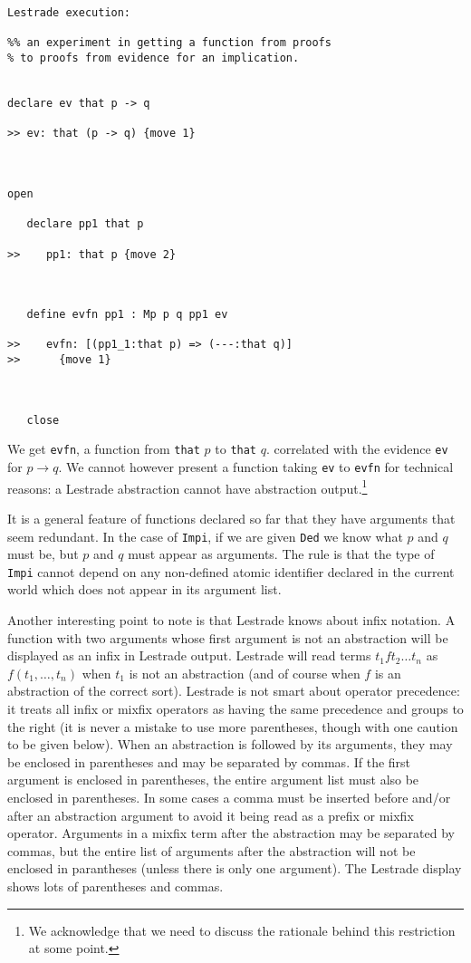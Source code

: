 \documentclass[12pt]{article}
\begin{document}
\begin{verbatim}Lestrade execution:

%% an experiment in getting a function from proofs
% to proofs from evidence for an implication.


declare ev that p -> q

>> ev: that (p -> q) {move 1}



open

   declare pp1 that p

>>    pp1: that p {move 2}



   define evfn pp1 : Mp p q pp1 ev

>>    evfn: [(pp1_1:that p) => (---:that q)]
>>      {move 1}



   close
\end{verbatim}

We get {\tt evfn}, a function from {\tt that} $p$ to {\tt that} $q$. correlated with the evidence {\tt ev} for $p \rightarrow q$.  We cannot however present a function
taking {\tt ev} to {\tt evfn} for technical reasons: a Lestrade abstraction cannot have abstraction output.\footnote{We acknowledge that we need to discuss the rationale behind this restriction at some point.}

It is a general feature of functions declared so far that they have arguments that seem redundant.  In the case of {\tt Impi}, if we are given {\tt Ded} we know what $p$ and $q$ must be, but $p$ and $q$ must appear as arguments.  The rule is that the type of {\tt Impi} cannot depend on any non-defined atomic identifier declared in the current world which does not appear in its argument list.

Another interesting point to note is that Lestrade knows about infix notation.  A function with two arguments whose first argument is not an abstraction will be displayed
as an infix in Lestrade output.  Lestrade will read terms $t_1 f t_2 \ldots t_n$ as $f(t_1,\ldots,t_n)$ when $t_1$ is not an abstraction (and of course when $f$ is an abstraction of the correct sort).  Lestrade is not smart about operator precedence:  it treats all infix or mixfix operators as having the same precedence and groups to the right (it is never a mistake to use more parentheses, though with one caution to be given below).   When an abstraction is followed by its arguments, they may be enclosed in parentheses and may be separated by commas.  If the first argument is
enclosed in parentheses, the entire argument list must also be enclosed in parentheses.  In some cases a comma must be inserted before and/or after an abstraction argument to avoid it being read as a prefix or mixfix operator.  Arguments in a mixfix term after the abstraction may be separated by commas, but the entire list of arguments after the abstraction will not be enclosed in parantheses (unless there is only one argument).  The Lestrade display shows lots of parentheses and commas.
\end{document}
